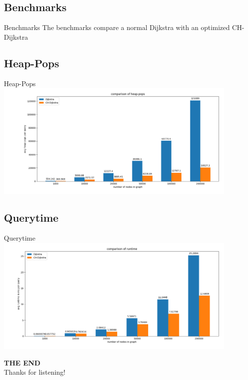 \documentclass[8pt, t, aspectratio=169]{beamer}
\begin{document}
\begin{huge}
\section{Benchmarks}
\begin{frame}{Benchmarks}
  \vfill
  The benchmarks compare a normal Dijkstra with an optimized CH-Dijkstra
  \vfill
\end{frame}

\subsection{Heap-Pops}

\begin{frame}{Heap-Pops}
  \vfill
  \centering
  \includegraphics[width=0.9\textwidth]{benchmark-q-pops.png}
  \vfill
\end{frame}

\subsection{Querytime}
\begin{frame}{Querytime}
  \vfill
  \centering
  \includegraphics[width=0.9\textwidth]{benchmark-time.png}
  \vfill
\end{frame}
		
\begin{frame}
  \thispagestyle{empty}
  \vspace{3cm}
  \begin{center}
	{\Huge \textbf{THE END}} \\
	{\large Thanks for listening!}
  \end{center}
\end{frame}
\end{huge}
		
\end{document}
